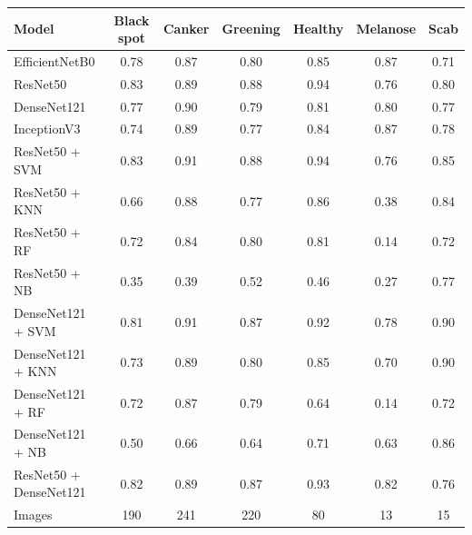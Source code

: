 \begin{tabular}{lcccccc}
\toprule
Model & Black spot & Canker & Greening & Healthy & Melanose & Scab \\
\midrule
EfficientNetB0 & 0.78 & 0.87 & 0.80 & 0.85 & 0.87 & 0.71 \\
ResNet50 & 0.83 & 0.89 & 0.88 & 0.94 & 0.76 & 0.80 \\
DenseNet121 & 0.77 & 0.90 & 0.79 & 0.81 & 0.80 & 0.77 \\
InceptionV3 & 0.74 & 0.89 & 0.77 & 0.84 & 0.87 & 0.78 \\
ResNet50 + SVM & 0.83 & 0.91 & 0.88 & 0.94 & 0.76 & 0.85 \\
ResNet50 + KNN & 0.66 & 0.88 & 0.77 & 0.86 & 0.38 & 0.84 \\
ResNet50 + RF & 0.72 & 0.84 & 0.80 & 0.81 & 0.14 & 0.72 \\
ResNet50 + NB & 0.35 & 0.39 & 0.52 & 0.46 & 0.27 & 0.77 \\
DenseNet121 + SVM & 0.81 & 0.91 & 0.87 & 0.92 & 0.78 & 0.90 \\
DenseNet121 + KNN & 0.73 & 0.89 & 0.80 & 0.85 & 0.70 & 0.90 \\
DenseNet121 + RF & 0.72 & 0.87 & 0.79 & 0.64 & 0.14 & 0.72 \\
DenseNet121 + NB & 0.50 & 0.66 & 0.64 & 0.71 & 0.63 & 0.86 \\
ResNet50 + DenseNet121 & 0.82 & 0.89 & 0.87 & 0.93 & 0.82 & 0.76 \\
\midrule
Images & 190 & 241 & 220 & 80 & 13 & 15 \\
\bottomrule
\end{tabular}
